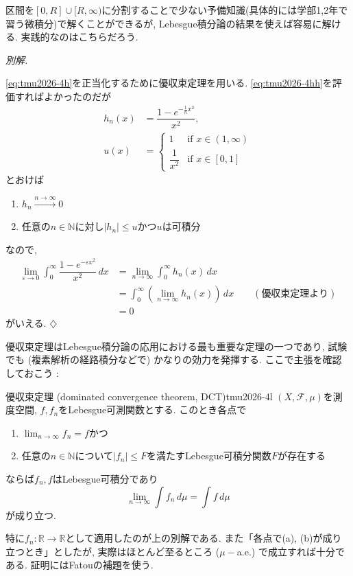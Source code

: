 \documentclass[titlepage]{jsarticle}
\numberwithin{equation}{section}
\newcommand{\N}{\mathbb{N}}%
\newcommand{\R}{\mathbb{R}}%
\newenvironment{kaitou}[1][解]{%
\begin{proofbox}%
\textit{#1. }\ignorespaces
}{%
\hfill$\diamondsuit$%
\end{proofbox}%
}
\begin{document}
\begin{marker}
区間を$[0, R] \cup [R, \infty)$に分割することで少ない予備知識(具体的には学部1,2年で習う微積分)で解くことができるが, Lebesgue積分論の結果を使えば容易に解ける. 実践的なのはこちらだろう.
\end{marker}
\begin{kaitou}[別解]
\eqref{eq:tmu2026-4h}を正当化するために優収束定理を用いる. \eqref{eq:tmu2026-4hh}を評価すればよかったのだが
\begin{align*}
h_n(x) &= \dfrac{1 - e^{-\frac{1}{n}x^2}}{x^2},\\
u(x) &=
\begin{cases}
1 & \text{if}\,\,x \in (1, \infty)\\
\dfrac{1}{x^2} & \text{if}\,\,x \in [0, 1]
\end{cases}
\end{align*}
とおけば
\begin{enumerate}[label=(\alph*)]
\item $h_n \stackrel{n \to \infty}{\longrightarrow} 0\quad$
\item 任意の$n \in \N$に対し$|h_n| \le u$かつ$u$は可積分
\end{enumerate}
なので, 
\begin{align*}
\lim_{\varepsilon \to 0} \int_0^\infty \dfrac{1 - e^{-\varepsilon x^2}}{x^2}\,dx &= \lim_{n \to \infty}\int_0^\infty h_n(x)\,dx\\
&=\int_0^\infty\left(\lim_{n\to \infty} h_n(x)\right)\,dx\qquad(\text{優収束定理より})\\
&= 0
\end{align*}
がいえる.
\end{kaitou}
優収束定理はLebesgue積分論の応用における最も重要な定理の一つであり, 試験でも (複素解析の経路積分などで) かなりの効力を発揮する. ここで主張を確認しておこう : 
\begin{thm}{優収束定理 (dominated convergence theorem, DCT)}{tmu2026-4l}
$(X, \mathcal{F}, \mu)$を測度空間, $f, f_n$をLebesgue可測関数とする. このとき各点で
\begin{enumerate}[label=(\alph*)]
\item $\displaystyle{\lim_{n \to \infty} f_n = f}$かつ
\item 任意の$n \in \N$について$|f_n| \le F$を満たすLebesgue可積分関数$F$が存在する
\end{enumerate}
ならば$f_n, f$はLebesgue可積分であり
\[
\lim_{n \to \infty} \int f_n\,d\mu = \int f\,d\mu
\]
が成り立つ. 
\end{thm}
特に$f_n : \R \to \R$として適用したのが上の別解である. また「各点で(a), (b)が成り立つとき」としたが, 実際はほとんど至るところ ($\mu-$a.e.) で成立すれば十分である. 証明にはFatouの補題を使う. 
\end{document}
